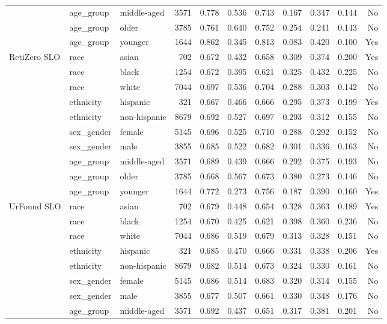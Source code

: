\begin{longtable}{@{}lllrrrrrrrr@{}}
 & age\_group & middle-aged & 3571 & 0.778 & 0.536 & 0.743 & 0.167 & 0.347 & 0.144 & No \\
 & age\_group & older & 3785 & 0.761 & 0.640 & 0.752 & 0.254 & 0.241 & 0.143 & No \\
 & age\_group & younger & 1644 & 0.862 & 0.345 & 0.813 & 0.083 & 0.420 & 0.100 & Yes \\
RetiZero SLO & race & asian & 702 & 0.672 & 0.432 & 0.658 & 0.309 & 0.374 & 0.200 & Yes \\
 & race & black & 1254 & 0.672 & 0.395 & 0.621 & 0.325 & 0.432 & 0.225 & No \\
 & race & white & 7044 & 0.697 & 0.536 & 0.704 & 0.288 & 0.303 & 0.142 & No \\
 & ethnicity & hispanic & 321 & 0.667 & 0.466 & 0.666 & 0.295 & 0.373 & 0.199 & Yes \\
 & ethnicity & non-hispanic & 8679 & 0.692 & 0.527 & 0.697 & 0.293 & 0.312 & 0.155 & No \\
 & sex\_gender & female & 5145 & 0.696 & 0.525 & 0.710 & 0.288 & 0.292 & 0.152 & No \\
 & sex\_gender & male & 3855 & 0.685 & 0.522 & 0.682 & 0.301 & 0.336 & 0.163 & No \\
 & age\_group & middle-aged & 3571 & 0.689 & 0.439 & 0.666 & 0.292 & 0.375 & 0.193 & No \\
 & age\_group & older & 3785 & 0.668 & 0.567 & 0.673 & 0.380 & 0.273 & 0.146 & No \\
 & age\_group & younger & 1644 & 0.772 & 0.273 & 0.756 & 0.187 & 0.390 & 0.160 & Yes \\
UrFound SLO & race & asian & 702 & 0.679 & 0.448 & 0.654 & 0.328 & 0.363 & 0.189 & Yes \\
 & race & black & 1254 & 0.670 & 0.425 & 0.621 & 0.398 & 0.360 & 0.236 & No \\
 & race & white & 7044 & 0.686 & 0.519 & 0.679 & 0.313 & 0.328 & 0.151 & No \\
 & ethnicity & hispanic & 321 & 0.685 & 0.470 & 0.666 & 0.331 & 0.338 & 0.206 & Yes \\
 & ethnicity & non-hispanic & 8679 & 0.682 & 0.514 & 0.673 & 0.324 & 0.330 & 0.161 & No \\
 & sex\_gender & female & 5145 & 0.686 & 0.514 & 0.683 & 0.320 & 0.314 & 0.155 & No \\
 & sex\_gender & male & 3855 & 0.677 & 0.507 & 0.661 & 0.330 & 0.348 & 0.176 & No \\
 & age\_group & middle-aged & 3571 & 0.692 & 0.437 & 0.651 & 0.317 & 0.381 & 0.201 & No \\

\end{longtable}
